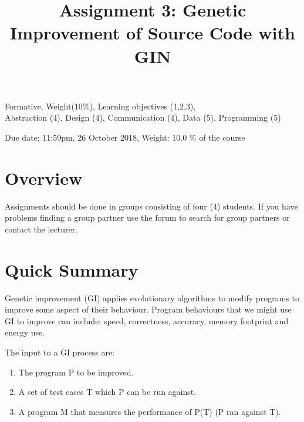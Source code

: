 \documentclass{pracs}
\newcommand{\duedate}{26 October 2018}
\begin{document}
\title{Assignment 3: Genetic Improvement of Source Code with GIN}
\maketitle
\thispagestyle{fancy}


	Formative, 	Weight(10\%), 	Learning objectives (1,2,3),\\
 	Abstraction (4), 	Design (4), 	Communication (4), 	Data (5),	Programming (5)


\noindent 

 \begin{center}
    Due date: 11:59pm, \duedate, Weight: 10.0 \% of the course
  \end{center}



\section{Overview}
Assignments should be done in groups consisting of four (4) students.  If you have problems finding a group partner use the forum to search for group partners or contact the lecturer.



\section*{Quick Summary}

Genetic improvement (GI) applies evolutionary algorithms to modify programs to improve some aspect of their behaviour. Program behaviours that we might use GI to improve can include: speed, correctness, accuracy, memory footprint and energy use. 

The input to a GI process are:

\begin{enumerate}
\item The program P to be improved.
\item A set of test cases T which P can be run against.
\item A program M that measures the performance of P(T) (P ran against T).
\end{enumerate}
\end{document}
